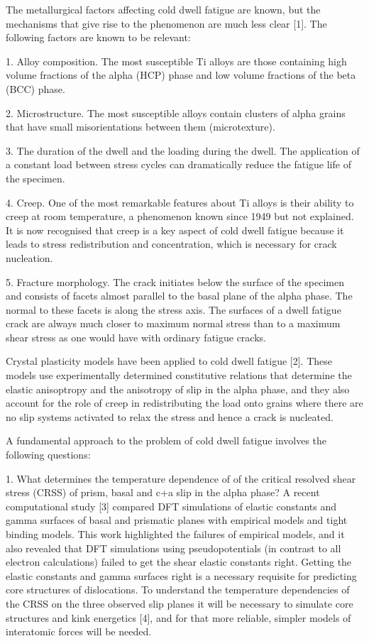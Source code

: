 The metallurgical factors affecting cold dwell fatigue are known, but the mechanisms that give rise to the phenomenon are much less clear [1]. The following factors are known to be relevant:

1. Alloy composition. The most susceptible Ti alloys are those containing high volume fractions of the alpha (HCP) phase and low volume fractions of the beta (BCC) phase.

2. Microstructure. The most susceptible alloys contain clusters of alpha grains that have small misorientations between them (microtexture).

3. The duration of the dwell and the loading during the dwell. The application of a constant load between stress cycles can dramatically reduce the fatigue life of the specimen.

4. Creep. One of the most remarkable features about Ti alloys is their ability to creep at room temperature, a phenomenon known since 1949 but not explained. It is now recognised that creep is a key aspect of cold dwell fatigue because it leads to stress redistribution and concentration, which is necessary for crack nucleation.

5. Fracture morphology. The crack initiates below the surface of the specimen and consists of facets almost parallel to the basal plane of the alpha phase. The normal to these facets is along the stress axis. The surfaces of a dwell fatigue crack are always much closer to maximum normal stress than to a maximum shear stress as one would have with ordinary fatigue cracks.

Crystal plasticity models have been applied to cold dwell fatigue [2]. These models use experimentally determined constitutive relations that determine the elastic anisoptropy and the anisotropy of slip in the alpha phase, and they also account for the role of creep in redistributing the load onto grains where there are no slip systems activated to relax the stress and hence a crack is nucleated.

A fundamental approach to the problem of cold dwell fatigue involves the following questions:

1. What determines the temperature dependence of of the critical resolved shear stress (CRSS) of prism, basal and c+a slip in the alpha phase? A recent computational study [3] compared DFT simulations of elastic constants and gamma surfaces of basal and prismatic planes with empirical models and tight binding models. This work highlighted the failures of empirical models, and it also revealed that DFT simulations using pseudopotentials (in contrast to all electron calculations) failed to get the shear elastic constants right. Getting the elastic constants and gamma surfaces right is a necessary requisite for predicting core structures of dislocations. To understand the temperature dependencies of the CRSS on the three observed slip planes it will be necessary to simulate core structures and kink energetics [4], and for that more reliable, simpler models of interatomic forces will be needed.

